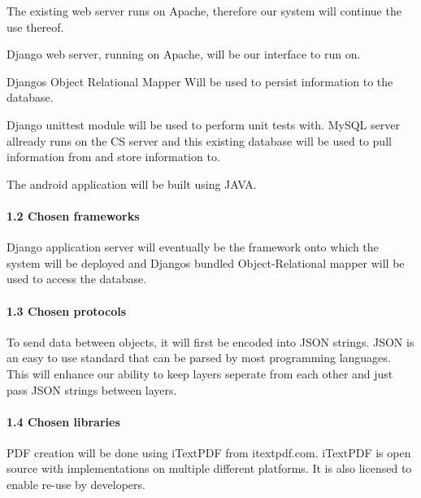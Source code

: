 \documentclass{article}
\begin{document}
\noindent The existing web server runs on Apache, therefore our system will continue the use thereof.

\noindent 

\noindent Django web server, running on Apache, will be our interface to run on.

\noindent 

\noindent Djangos Object Relational Mapper Will be used to persist information to the database.

\noindent 

\noindent Django unittest module will be used to perform unit tests with. MySQL server allready runs on the CS server and this existing database will be used to pull information from and store information to.



\noindent The android application will be built using JAVA.




\paragraph{1.2  Chosen frameworks}

\noindent Django application server will eventually be the framework onto which the system will be deployed and Djangos bundled Object-Relational mapper will be used to access the database. 

\noindent 


\paragraph{1.3  Chosen protocols}

\noindent To send data between objects, it will first be encoded into JSON strings. JSON is an easy to use standard that can be parsed by most programming languages. This will enhance our ability to keep layers seperate from each other and just pass JSON strings between layers. 




\paragraph{1.4  Chosen libraries}

\noindent PDF creation will be done using iTextPDF from itextpdf.com. iTextPDF is open source with implementations on multiple different platforms. It is also licensed to enable re-use by developers.
\end{document}

